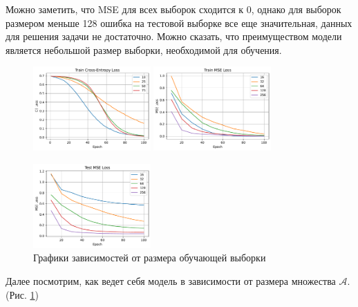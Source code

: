 \documentclass[12pt]{article}
\begin{document}
Можно заметить, что MSE для всех выборок сходится к 0, однако для выборок размером меньше 128 ошибка на тестовой выборке все еще значительная, данных для решения задачи не достаточно. Можно сказать, что преимуществом модели является небольшой размер выборки, необходимой для обучения.

\begin{figure}
    \centering
    \includegraphics[width=0.4\textwidth]{adnn_train_size_epoch_train_loss.pdf}
    \quad
    \includegraphics[width=0.4\textwidth]{adnn_train_size_epoch_train_mse.pdf}
    
    \includegraphics[width=0.4\textwidth]{adnn_train_size_epoch_test_mse.pdf}
    \caption{Графики зависимостей от размера обучающей выборки}
    \label{adnn_train_size}
\end{figure}

Далее посмотрим, как ведет себя модель в зависимости от размера множества $\mathcal{A}$. (Рис. \ref{adnn_train_size})
\end{document}
